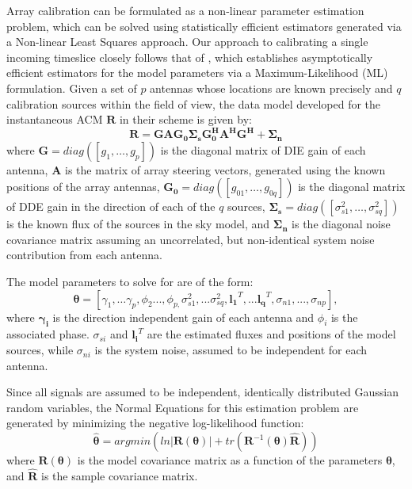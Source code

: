 \documentclass{aa}
\begin{document}
Array  calibration  can  be  formulated  as a  non-linear  parameter  estimation
problem,  which  can  be   solved  using  statistically  efficient  estimators
generated via a Non-linear Least Squares approach. Our approach to calibrating a
single      incoming      timeslice       closely      follows      that      of
\citet{wijnholds2009multisource},  which  establishes  asymptotically  efficient
estimators   for   the   model   parameters  via   a   Maximum-Likelihood   (ML)
formulation. Given a set of $p$ antennas whose locations are known precisely and
$q$ calibration sources  within the field of view, the  data model developed for
the instantaneous ACM $\mathbf{R}$ in their scheme is given by:
\begin{equation}
\mathbf{R=GAG_{0}\Sigma_{s}G_{0}^{H}A^{H}G^{H}+\Sigma_{n}}\label{eq:datamodel}
\end{equation}
where    \textbf{$\mathbf{G=}diag(\left[g_{1},\ldots,g_{p}\right])$    }is   the
diagonal matrix of DIE gain of each antenna, $\mathbf{A}$ is the matrix of array
steering vectors,  generated using  the known positions  of the  array antennas,
$\mathbf{G_{0}=}diag(\left[g_{01},\ldots,g_{0q}\right])$ is  the diagonal matrix
of   DDE   gain    in   the   direction   of   each    of   the   $q$   sources,
$\mathbf{\Sigma_{s}}=diag\left(\left[\sigma_{s1}^{2},\ldots,\sigma_{sq}^{2}\right]\right)$
is the known flux of the  sources in the sky model, and $\mathbf{\Sigma_{n}}$ is
the diagonal noise covariance matrix assuming an uncorrelated, but non-identical
system noise contribution from each antenna.

The model parameters to solve for are of the form:
\begin{equation}
\bm{\theta}=[\gamma_{1},\ldots\gamma_{p},\phi_{2}...,\phi_{p,}\sigma_{s1}^{2},...\sigma_{sq}^{2},\mathbf{l_{1}}^{T},...\mathbf{l_{q}}^{T},\sigma_{n1},...,\sigma_{np}],\label{eq:estparam}
\end{equation}
 where $\mathbf{\gamma_{i}}$  is the direction independent gain  of each antenna
 and $\phi_{i}$ is the  associated phase. $\sigma_{si}$ and $\mathbf{l_i}^{T}$ are
 the estimated fluxes and positions of the model sources, while $\sigma_{ni}$ is
 the system noise, assumed to be independent for each antenna.

Since  all  signals  are  assumed  to be  independent,  identically  distributed
Gaussian random variables, the Normal  Equations for this estimation problem are
generated by minimizing the negative log-likelihood function:
\begin{equation}
\bm{\hat{\theta}}=argmin\left(ln|\bm{R(\theta)}|+tr(\mathbf{R}^{-1}(\bm{\theta})\mathbf{\widehat{R}})\right)\label{eq:normeq}
\end{equation}
 where  $\bm{R(\theta)}$  is  the  model  covariance  matrix  as  a
 function of  the parameters $\bm{\theta}$,  and $\mathbf{\widehat{R}}$ is
 the sample covariance matrix.
\end{document}
